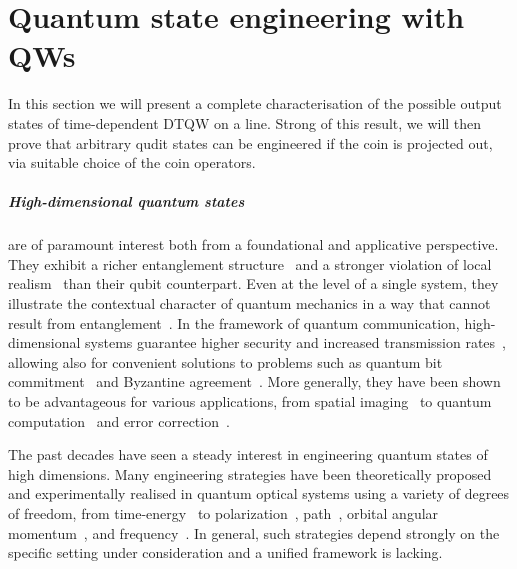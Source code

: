 
\chapter{Quantum state engineering with QWs}
\label{sec:quantum_walks}

In this section we will present a complete characterisation of the possible output states of time-dependent \ac{DTQW} on a line. Strong of this result, we will then prove that arbitrary qudit states can be engineered if the coin is projected out, via suitable choice of the coin operators.

\paragraph{High-dimensional quantum states}
are of paramount interest both from a foundational and applicative perspective. They exhibit a richer entanglement structure~\cite{horodecki2009quantum} and a stronger violation of local realism~\cite{brunner2014bell} than their qubit counterpart. Even at the level of a single system, they illustrate the contextual character of quantum mechanics in a way that cannot result from entanglement~\cite{lapkiewicz2011experimental}. 
In the framework of quantum communication, high-dimensional systems guarantee higher security and increased transmission rates~\cite{bechmannpasquinucci2000quantum, cerf2002security, bru2002optimal, acin2003security, karimipour2002quantum, durt2004security, nunn2013largealphabet, mower2013highdimensional, lee2014entanglementbased, zhong2015photonefficient}, allowing also for convenient solutions to problems such as quantum bit commitment~\cite{langford2004measuring} and  Byzantine agreement~\cite{fitzi2001quantum}.
More generally, they have been shown to be advantageous for various applications,
from spatial imaging~\cite{howland2013efficient} to quantum computation~\cite{bartlett2002quantum, ralph2007efficient} and error correction~\cite{campbell2012magicstate}.

The past decades have seen a steady interest in engineering quantum states of high dimensions. %
Many engineering strategies have been theoretically proposed and experimentally realised in quantum optical systems using a variety of degrees of freedom, from time-energy~\cite{thew2004belltype, bessire2014versatile} to polarization~\cite{bogdanov2004qutrit}, path~\cite{osullivanhale2005pixel}, orbital angular momentum~\cite{mair2001entanglement, mclaren2012entangled, krenn2013entangled, krenn2014generation, zhang2016engineering}, and frequency~\cite{bernhard2013shaping, jin2016simple}. In general, such strategies depend strongly on the specific setting under consideration and a unified framework is lacking. 


